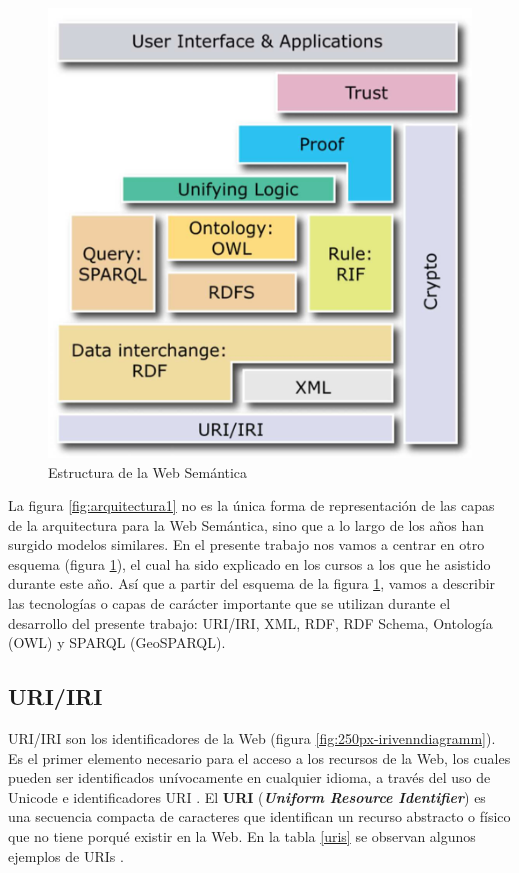 \begin{figure}[H]
	\centering
	\includegraphics[width=0.5\linewidth]{imagenes/capitulo3/arquitectura2}
	\caption{Estructura de la Web Semántica}
	\label{fig:arquitectura2}
\end{figure}

La figura \ref{fig:arquitectura1} no es la única forma de representación de las capas de la arquitectura para la Web Semántica, sino que a lo largo de los años han surgido modelos similares. En el presente trabajo nos vamos a centrar en otro esquema (figura \ref{fig:arquitectura2}), el cual ha sido explicado en los cursos a los que he asistido durante este año. Así que a partir del esquema de la figura \ref{fig:arquitectura2}, vamos a describir las tecnologías o capas de carácter importante que se utilizan durante el desarrollo del presente trabajo: URI/IRI, XML, RDF, RDF Schema, Ontología (OWL) y SPARQL (GeoSPARQL).


\subsection{URI/IRI}

URI/IRI son los identificadores de la Web (figura \ref{fig:250px-irivenndiagramm}). Es el primer elemento necesario para el acceso a los recursos de la Web, los cuales pueden ser identificados unívocamente en cualquier idioma, a través del uso de Unicode e identificadores URI \cite{aplicacion}. El \textbf{URI} (\textit{\textbf{Uniform Resource Identifier}}) es una secuencia compacta de caracteres que identifican un recurso abstracto o físico que no tiene porqué existir en la Web. En la tabla \ref{uris} se observan algunos ejemplos de URIs \cite{uri}.

